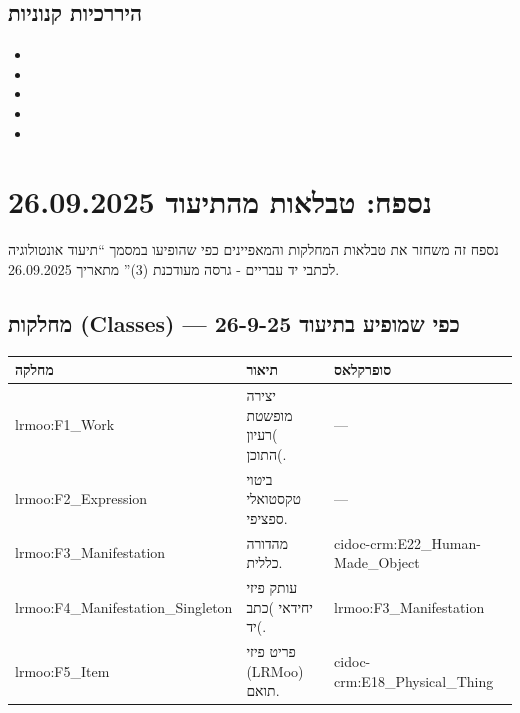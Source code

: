 \subsection{היררכיות קנוניות}

\begin{itemize}
\item {}
\item {}
\item {}
\item {}
\item {}
\end{itemize}

\newpage

\section{נספח: טבלאות מהתיעוד 26.09.2025}

נספח זה משחזר את טבלאות המחלקות והמאפיינים כפי שהופיעו במסמך \textenglish{``תיעוד אונטולוגיה לכתבי יד עבריים - גרסה מעודכנת (3)''} מתאריך 26.09.2025.

\subsection{מחלקות (Classes) — כפי שמופיע בתיעוד 26-9-25}

{\small
\begin{longtable}{|p{4.5cm}|p{8.5cm}|p{3cm}|}
\hline
\textbf{מחלקה} & \textbf{תיאור} & \textbf{סופרקלאס} \\
\hline
\endhead

\textenglish{lrmoo:F1\_Work} & יצירה מופשטת )רעיון התוכן(. & — \\
\hline
\textenglish{lrmoo:F2\_Expression} & ביטוי טקסטואלי ספציפי. & — \\
\hline
\textenglish{lrmoo:F3\_Manifestation} & מהדורה כללית. & \textenglish{cidoc-crm:E22\_Human-Made\_Object} \\
\hline
\textenglish{lrmoo:F4\_Manifestation\_Singleton} & עותק פיזי יחידאי )כתב יד(. & \textenglish{lrmoo:F3\_Manifestation} \\
\hline
\textenglish{lrmoo:F5\_Item} & פריט פיזי \textenglish{(LRMoo)} תואם. & \textenglish{cidoc-crm:E18\_Physical\_Thing} \\
\hline
\end{longtable}
}

